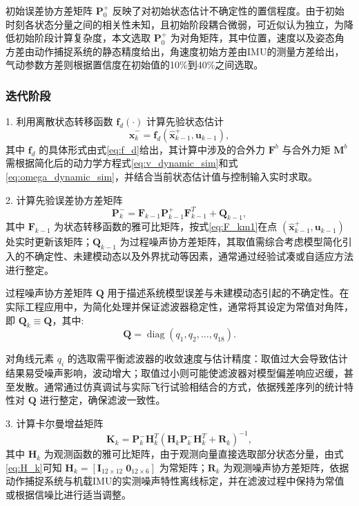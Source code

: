     初始误差协方差矩阵 $\boldsymbol{P}_0^+$ 反映了对初始状态估计不确定性的置信程度。由于初始时刻各状态分量之间的相关性未知，且初始阶段耦合微弱，可近似认为独立，为降低初始阶段计算复杂度，本文选取 $\boldsymbol{P}_0^+$ 为对角矩阵，其中位置，速度以及姿态角方差由动作捕捉系统的静态精度给出，角速度初始方差由IMU的测量方差给出，气动参数方差则根据置信度在初始值的10\%到40\%之间选取。

\subsubsection{迭代阶段}

1. 利用离散状态转移函数 $\boldsymbol{f}_d(\cdot)$ 计算先验状态估计
\begin{equation}
    \hat{\boldsymbol{x}}_{k}^{-} = \boldsymbol{f}_d(\hat{\boldsymbol{x}}_{k-1}^{+}, \boldsymbol{u}_{k-1}),
\end{equation}
其中 $\boldsymbol{f}_d$ 的具体形式由式\eqref{eq:f_d}给出，其计算中涉及的合外力 $\boldsymbol{F}^b$ 与合外力矩 $\boldsymbol{M}^b$ 需根据简化后的动力学方程式\eqref{eq:v_dynamic_sim}和式\eqref{eq:omega_dynamic_sim}，并结合当前状态估计值与控制输入实时求取。

2. 计算先验误差协方差矩阵
\begin{equation}
    \boldsymbol{P}_{k}^{-} = \boldsymbol{F}_{k-1} \boldsymbol{P}_{k-1}^{+} \boldsymbol{F}_{k-1}^{T} + \boldsymbol{Q}_{k-1},
\end{equation}
其中 $\boldsymbol{F}_{k-1}$ 为状态转移函数的雅可比矩阵，按式\eqref{eq:F_km1}在点 $(\hat{\boldsymbol{x}}_{k-1}^{+}, \boldsymbol{u}_{k-1})$ 处实时更新该矩阵；$\boldsymbol{Q}_{k-1}$ 为过程噪声协方差矩阵，其取值需综合考虑模型简化引入的不确定性、未建模动态以及外界扰动等因素，通常通过经验试凑或自适应方法进行整定。

过程噪声协方差矩阵 $\boldsymbol{Q}$ 用于描述系统模型误差与未建模动态引起的不确定性。在实际工程应用中，为简化处理并保证滤波器稳定性，通常将其设定为常值对角阵，即 $\boldsymbol{Q}_k \equiv \boldsymbol{Q}$，其中:
\begin{equation}
    \boldsymbol{Q} = \operatorname{diag}(q_1, q_2, \dots, q_{18}).
\end{equation}

对角线元素 $q_i$ 的选取需平衡滤波器的收敛速度与估计精度：取值过大会导致估计结果易受噪声影响，波动增大；取值过小则可能使滤波器对模型偏差响应迟缓，甚至发散。通常通过仿真调试与实际飞行试验相结合的方式，依据残差序列的统计特性对 $\boldsymbol{Q}$ 进行整定，确保滤波一致性。

3. 计算卡尔曼增益矩阵
\begin{equation}
    \boldsymbol{K}_k = \boldsymbol{P}_{k}^{-} \boldsymbol{H}_k^{T} \left( \boldsymbol{H}_k \boldsymbol{P}_{k}^{-} \boldsymbol{H}_k^{T} + \boldsymbol{R}_k \right)^{-1},
\end{equation}
其中 $\boldsymbol{H}_k$ 为观测函数的雅可比矩阵，由于观测向量直接选取部分状态分量，由式\eqref{eq:H_k}可知 $\boldsymbol{H}_k = [\boldsymbol{I}_{12\times 12} \; \boldsymbol{0}_{12\times 6}]$ 为常矩阵；$\boldsymbol{R}_k$ 为观测噪声协方差矩阵，依据动作捕捉系统与机载IMU的实测噪声特性离线标定，并在滤波过程中保持为常值或根据信噪比进行适当调整。

